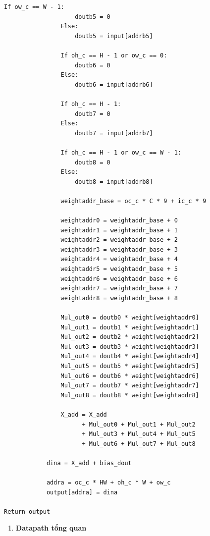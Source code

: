 \documentclass{uetgraduation}
\begin{document}
\begin{Verbatim}[frame=single]
                If ow_c == W - 1:
                    doutb5 = 0
                Else:
                    doutb5 = input[addrb5]

                If oh_c == H - 1 or ow_c == 0:
                    doutb6 = 0
                Else:
                    doutb6 = input[addrb6]

                If oh_c == H - 1:
                    doutb7 = 0
                Else:
                    doutb7 = input[addrb7]

                If oh_c == H - 1 or ow_c == W - 1:
                    doutb8 = 0
                Else:
                    doutb8 = input[addrb8]

                weightaddr_base = oc_c * C * 9 + ic_c * 9

                weightaddr0 = weightaddr_base + 0
                weightaddr1 = weightaddr_base + 1
                weightaddr2 = weightaddr_base + 2
                weightaddr3 = weightaddr_base + 3
                weightaddr4 = weightaddr_base + 4
                weightaddr5 = weightaddr_base + 5
                weightaddr6 = weightaddr_base + 6
                weightaddr7 = weightaddr_base + 7
                weightaddr8 = weightaddr_base + 8

                Mul_out0 = doutb0 * weight[weightaddr0]
                Mul_out1 = doutb1 * weight[weightaddr1]
                Mul_out2 = doutb2 * weight[weightaddr2]
                Mul_out3 = doutb3 * weight[weightaddr3]
                Mul_out4 = doutb4 * weight[weightaddr4]
                Mul_out5 = doutb5 * weight[weightaddr5]
                Mul_out6 = doutb6 * weight[weightaddr6]
                Mul_out7 = doutb7 * weight[weightaddr7]
                Mul_out8 = doutb8 * weight[weightaddr8]

                X_add = X_add
                      + Mul_out0 + Mul_out1 + Mul_out2
                      + Mul_out3 + Mul_out4 + Mul_out5
                      + Mul_out6 + Mul_out7 + Mul_out8

            dina = X_add + bias_dout

            addra = oc_c * HW + oh_c * W + ow_c
            output[addra] = dina

Return output
\end{Verbatim}

\begin{enumerate}
    \item \textbf{Datapath tổng quan}
\end{enumerate}
\end{document}
